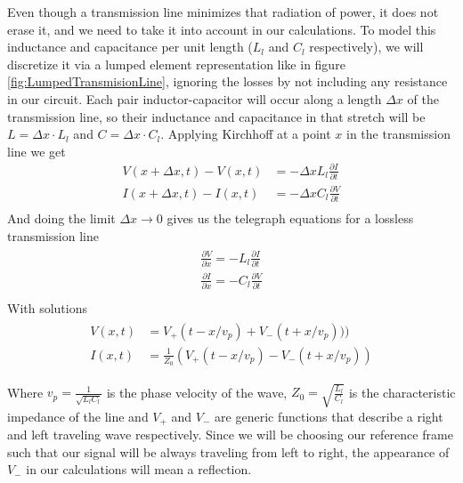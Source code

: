 \documentclass[../main.tex]{subfiles}
\begin{document}
Even though a transmission line minimizes that radiation of power, it does not
erase it, and we need to take it into account in our calculations. To model this
inductance and capacitance per unit length (\(L_{l}\) and \(C_{l}\) respectively),
we will discretize it via a lumped element representation like in figure
\ref{fig:LumpedTransmisionLine}, ignoring the losses by not including any
resistance  in our circuit.
Each pair inductor-capacitor will occur along a length \(\Delta x\) of the
transmission line, so their inductance and capacitance in that stretch will be
\(L = \Delta x \cdot L_{l}\) and \(C = \Delta x \cdot C_{l}\). Applying Kirchhoff
at a point \(x\) in the transmission line we get
\begin{align*}
    V(x+\Delta x, t) - V(x, t) &= -\Delta x L_{l} \frac{\partial I}{\partial t}\\
    I(x+\Delta x, t) - I(x, t) &= -\Delta x C_{l} \frac{\partial V}{\partial t}\\
\end{align*}
And doing the limit \(\Delta x \to 0\) gives us the telegraph equations for a
lossless transmission line
\begin{align}
\begin{split}
\label{eq:TelegraphEq}
    \frac{\partial V}{\partial x} = - L_{l}\frac{\partial I}{\partial t}\\
    \frac{\partial I}{\partial x} = - C_{l}\frac{\partial V}{\partial t}\\
\end{split}
\end{align}
With solutions
\begin{align*}
\begin{split}
    \label{eq:TelegraphSol}
    V(x,t) &= V_{+}(t - x/v_{p}) + V_{-}(t + x/v_{p})))\\
    I(x,t) &= \frac{1}{Z_{0}}(V_{+}(t - x/v_{p}) - V_{-}(t + x/v_{p}))
\end{split}
\end{align*}

Where \(v_{p} = \frac{1}{\sqrt{L_{l}C_{l}}}\) is the phase velocity of the wave,
\(Z_{0} = \sqrt{\frac{L_{l}}{C_{l}}}\) is the characteristic impedance of the
line and \(V_{+}\) and \(V_{-}\) are generic functions that describe a right
and left traveling wave respectively. Since we will be choosing our reference
frame such that our signal will be always traveling from left to right, the
appearance of \(V_{-}\) in our calculations will mean a reflection.
\end{document}
